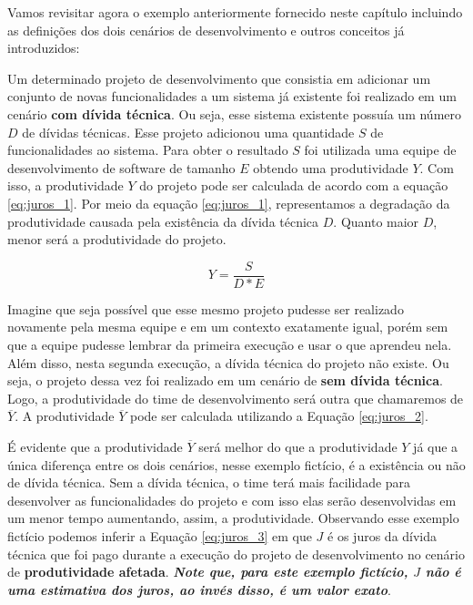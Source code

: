 Vamos revisitar agora o exemplo anteriormente fornecido neste capítulo incluindo as definições dos dois cenários de desenvolvimento e outros conceitos já introduzidos: 

\begin{tcolorbox}

Um determinado projeto de desenvolvimento que consistia em adicionar um conjunto de novas funcionalidades a um sistema já existente foi realizado em um cenário \textbf{com dívida técnica}. Ou seja, esse sistema existente possuía um número  $D$ de dívidas técnicas.  Esse projeto adicionou uma quantidade $S$ de funcionalidades ao sistema. Para obter o resultado  $S$  foi utilizada  uma equipe de desenvolvimento de software de tamanho $E$ obtendo uma produtividade $Y$.   Com isso, a produtividade $Y$ do projeto pode ser calculada de acordo com a equação \ref{eq:juros_1}. Por meio da equação \ref{eq:juros_1}, representamos a degradação da produtividade causada pela existência da dívida técnica $D$. Quanto maior $D$, menor será a produtividade do projeto.

\begin{equation}
\label{eq:juros_1}
Y =  \frac{S}{D*E}
\end{equation}

\end{tcolorbox}




Imagine que seja possível que esse mesmo projeto pudesse ser realizado novamente pela mesma equipe e em um contexto exatamente igual, porém sem que a equipe pudesse lembrar da primeira execução e usar o que aprendeu nela. Além disso, nesta segunda execução, a dívida técnica do projeto não existe. Ou seja, o projeto dessa vez foi realizado em um cenário de \textbf{sem dívida técnica}. Logo, a produtividade do time de desenvolvimento será outra que chamaremos de $\overline{Y}$. A produtividade  $\overline{Y}$ pode ser calculada utilizando a Equação \ref{eq:juros_2}. 

É evidente que  a produtividade $\overline{Y}$ será melhor do que a produtividade  $Y$ já que a única diferença entre os dois cenários, nesse exemplo fictício,  é a existência ou não de dívida técnica. Sem a dívida técnica, o time terá mais facilidade para desenvolver as funcionalidades do projeto e com isso elas serão desenvolvidas em um menor tempo aumentando, assim, a produtividade. Observando esse exemplo fictício podemos inferir a Equação \ref{eq:juros_3} em que $J$ é os juros da dívida técnica que foi pago durante a execução do projeto de desenvolvimento no cenário de \textbf{produtividade afetada}. \textit{\textbf{Note que, para este exemplo fictício,  $J$ não  é uma estimativa dos juros, ao invés disso, é um valor exato}}.  

